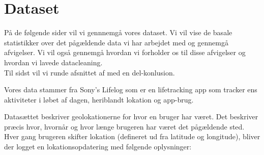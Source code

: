 \chapter{Dataset}
\label{chap:dataset}
På de følgende sider vil vi gennnemgå vores dataset. Vi vil vise de basale statistikker over det pågældende data vi har arbejdet med og gennemgå afvigelser. Vi vil også gennemgå hvordan vi forholder os til disse afvigelser og hvordan vi lavede datacleaning. \\
Til sidst vil vi runde afsnittet af med en del-konlusion. 

Vores data stammer fra Sony's Lifelog\cite{sonyLifeLog} som er en lifetracking app som tracker ens aktiviteter i løbet af dagen, heriblandt lokation og app-brug.

Datasættet beskriver geolokationerne for hvor en bruger har været. Det beskriver præcis hvor, hvornår og hvor længe brugeren har været det pågældende sted. Hver gang brugeren skifter lokation (defineret ud fra latitude og longitude), bliver der logget en lokationsopdatering med følgende oplysninger:

